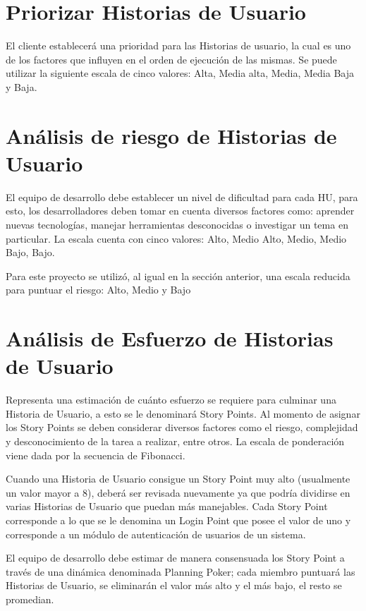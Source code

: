 \section{Priorizar Historias de Usuario}

El cliente establecerá una prioridad para las Historias de usuario, la cual es uno de los factores que influyen en el orden de ejecución de las mismas. Se puede utilizar la siguiente escala de cinco valores: Alta, Media alta, Media, Media Baja y Baja.

\section{Análisis de riesgo de Historias de Usuario}
El equipo de desarrollo debe establecer un nivel de dificultad para cada HU, para esto, los desarrolladores deben tomar en cuenta diversos factores como: aprender nuevas tecnologías, manejar herramientas desconocidas o investigar un tema en particular. La escala cuenta con cinco valores: Alto, Medio Alto, Medio, Medio Bajo, Bajo.

Para este proyecto se utilizó, al igual en la sección anterior, una escala reducida para puntuar el riesgo: Alto, Medio y Bajo

\section{Análisis de Esfuerzo de Historias de Usuario}
Representa una estimación de cuánto esfuerzo se requiere para culminar una Historia de Usuario, a esto se le denominará Story Points. Al momento de asignar los Story Points se deben considerar diversos factores como el riesgo, complejidad  y desconocimiento de la tarea a realizar, entre otros. La escala de ponderación viene dada por la secuencia de Fibonacci.

Cuando una Historia de Usuario consigue un Story Point muy alto (usualmente un valor mayor a 8), deberá ser revisada nuevamente ya que podría dividirse en varias Historias de Usuario que puedan más manejables.  Cada Story Point corresponde a lo que se le denomina un Login Point que posee el valor de uno y corresponde a un módulo de autenticación de usuarios de un sistema.

El equipo de desarrollo debe estimar de manera consensuada los Story Point a través de una dinámica denominada Planning Poker; cada miembro puntuará las Historias de Usuario, se eliminarán el valor más alto y el más bajo, el resto se promedian.

